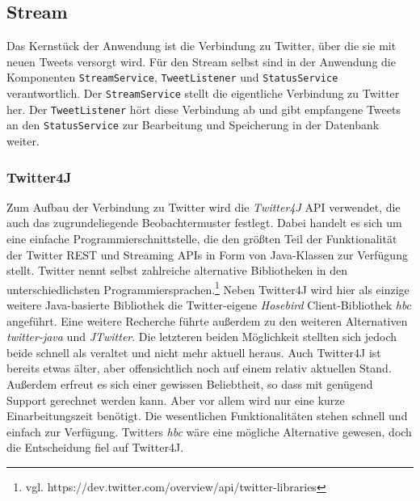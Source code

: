 \subsection{Stream}
Das Kernstück der Anwendung ist die Verbindung zu Twitter, über die sie mit neuen Tweets versorgt wird. 
Für den Stream selbst sind in der Anwendung die Komponenten \texttt{StreamService}, \texttt{TweetListener} und 
\texttt{StatusService} verantwortlich. Der \texttt{StreamService} stellt die eigentliche Verbindung zu Twitter her. Der 
\texttt{TweetListener} hört diese Verbindung ab und gibt empfangene Tweets an den \texttt{StatusService} zur Bearbeitung 
und Speicherung in der Datenbank weiter.

\subsubsection*{Twitter4J}
Zum Aufbau der Verbindung zu Twitter wird die \textit{Twitter4J} API verwendet, die auch das zugrundeliegende 
Beobachtermuster festlegt. Dabei handelt es sich um eine einfache Programmierschnittstelle, die den 
größten Teil der Funktionalität der Twitter REST und Streaming APIs in Form von Java-Klassen zur 
Verfügung stellt. Twitter nennt selbst zahlreiche alternative Bibliotheken in den unterschiedlichsten 
Programmiersprachen.\footnote{vgl. https://dev.twitter.com/overview/api/twitter-libraries} Neben Twitter4J wird hier als einzige weitere Java-basierte Bibliothek die Twitter-eigene 
\textit{Hosebird} Client-Bibliothek \textit{hbc} angeführt. Eine weitere Recherche führte außerdem zu den weiteren Alternativen 
\textit{twitter-java} und \textit{JTwitter}. Die letzteren beiden Möglichkeit stellten sich jedoch beide schnell als veraltet und 
nicht mehr aktuell heraus. Auch Twitter4J ist bereits etwas älter, aber offensichtlich noch auf einem relativ 
aktuellen Stand. Außerdem erfreut es sich einer gewissen Beliebtheit, so dass mit genügend Support gerechnet 
werden kann. Aber vor allem wird nur eine kurze Einarbeitungszeit benötigt. Die wesentlichen Funktionalitäten 
stehen schnell und einfach zur Verfügung. Twitters \textit{hbc} wäre eine mögliche Alternative gewesen, doch 
die Entscheidung fiel auf Twitter4J.


